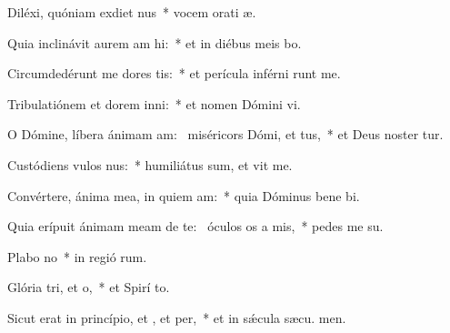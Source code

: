 \item Diléxi, quóniam exdiet nus~* vocem orati æ.
\item Quia inclinávit aurem am hi:~* et in diébus meis bo.
\item Circumdedérunt me dores tis:~* et perícula inférni runt me.
\item Tribulatiónem et dorem inni:~* et nomen Dómini vi.
\item O Dómine, líbera ánimam am:~\pscross{} miséricors Dómi, et tus,~* et Deus noster tur.
\item Custódiens vulos nus:~* humiliátus sum, et vit me.
\item Convértere, ánima mea, in quiem am:~* quia Dóminus bene bi.
\item Quia erípuit ánimam meam de te:~\pscross{} óculos os a mis,~* pedes me  su.
\item Plabo no~* in regió rum.
\item Glória tri, et o,~* et Spirí to.
\item Sicut erat in princípio, et , et per,~* et in sǽcula sæcu. men.
